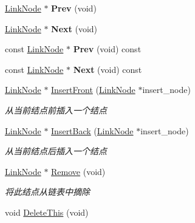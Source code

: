 \begin{DoxyCompactItemize}
\item 
\hypertarget{class_util_1_1_link_list_t_1_1_link_node_a0e5bd63bc72f8364cd69626abf0642f2}{\hyperlink{class_util_1_1_link_list_t_1_1_link_node}{Link\-Node} $\ast$ {\bfseries Prev} (void)}\label{class_util_1_1_link_list_t_1_1_link_node_a0e5bd63bc72f8364cd69626abf0642f2}

\item 
\hypertarget{class_util_1_1_link_list_t_1_1_link_node_a0c65931d4dbe39277188b4427b1a868d}{\hyperlink{class_util_1_1_link_list_t_1_1_link_node}{Link\-Node} $\ast$ {\bfseries Next} (void)}\label{class_util_1_1_link_list_t_1_1_link_node_a0c65931d4dbe39277188b4427b1a868d}

\item 
\hypertarget{class_util_1_1_link_list_t_1_1_link_node_a72b4f30665bb6d3db96dfc9a6b5fb6b8}{const \hyperlink{class_util_1_1_link_list_t_1_1_link_node}{Link\-Node} $\ast$ {\bfseries Prev} (void) const }\label{class_util_1_1_link_list_t_1_1_link_node_a72b4f30665bb6d3db96dfc9a6b5fb6b8}

\item 
\hypertarget{class_util_1_1_link_list_t_1_1_link_node_a63656a081ea57b75749d1537f5dc2ba8}{const \hyperlink{class_util_1_1_link_list_t_1_1_link_node}{Link\-Node} $\ast$ {\bfseries Next} (void) const }\label{class_util_1_1_link_list_t_1_1_link_node_a63656a081ea57b75749d1537f5dc2ba8}

\item 
\hyperlink{class_util_1_1_link_list_t_1_1_link_node}{Link\-Node} $\ast$ \hyperlink{class_util_1_1_link_list_t_1_1_link_node_ab0f5fe8ce5af542f3cc27ca0d2010385}{Insert\-Front} (\hyperlink{class_util_1_1_link_list_t_1_1_link_node}{Link\-Node} $\ast$insert\-\_\-node)
\begin{DoxyCompactList}\small\item\em 从当前结点前插入一个结点 \end{DoxyCompactList}\item 
\hyperlink{class_util_1_1_link_list_t_1_1_link_node}{Link\-Node} $\ast$ \hyperlink{class_util_1_1_link_list_t_1_1_link_node_a5a36b9f8bf7b7f437dc0a5a580712946}{Insert\-Back} (\hyperlink{class_util_1_1_link_list_t_1_1_link_node}{Link\-Node} $\ast$insert\-\_\-node)
\begin{DoxyCompactList}\small\item\em 从当前结点后插入一个结点 \end{DoxyCompactList}\item 
\hyperlink{class_util_1_1_link_list_t_1_1_link_node}{Link\-Node} $\ast$ \hyperlink{class_util_1_1_link_list_t_1_1_link_node_a2b7de5933a5f5962a370e5aba76394c3}{Remove} (void)
\begin{DoxyCompactList}\small\item\em 将此结点从链表中摘除 \end{DoxyCompactList}\item 
\hypertarget{class_util_1_1_link_list_t_1_1_link_node_a63c1e72e7b7cb54d3fb35ecf3e2044a7}{void \hyperlink{class_util_1_1_link_list_t_1_1_link_node_a63c1e72e7b7cb54d3fb35ecf3e2044a7}{Delete\-This} (void)}\label{class_util_1_1_link_list_t_1_1_link_node_a63c1e72e7b7cb54d3fb35ecf3e2044a7}


\end{DoxyCompactItemize}
